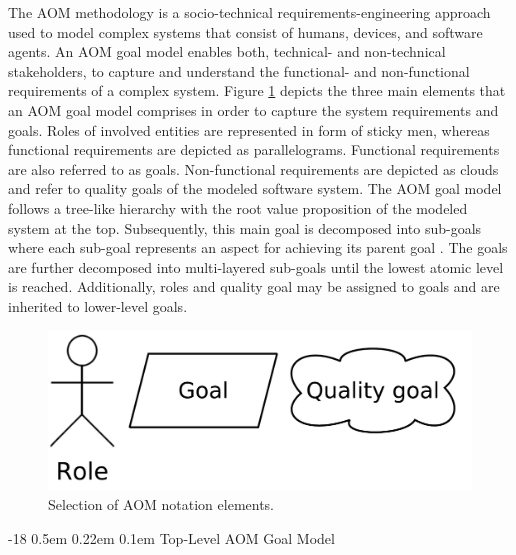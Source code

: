 \documentclass{llncs}
\makeatletter
\renewcommand\subsubsection{\@startsection{subsubsection}{3}{\z@}%
		{-18\p@ \@plus -4\p@ \@minus -4\p@}%
		{0.5em \@plus 0.22em \@minus 0.1em}%
		{\normalfont\normalsize\bfseries\boldmath}}
\makeatother
\begin{document}
{			The AOM methodology is a socio-technical requirements-engineering approach used to model complex systems that consist of humans, devices, and software agents. An AOM goal model enables both, technical- and non-technical stakeholders, to capture and understand the functional- and non-functional requirements of a complex system. Figure \ref{fig:aom-notaion-elements} depicts the three main elements that an AOM goal model comprises in order to capture the system requirements and goals. Roles of involved entities are represented in form of sticky men, whereas functional requirements are depicted as parallelograms. Functional requirements are also referred to as goals. Non-functional requirements are depicted as clouds and refer to quality goals of the modeled software system. The AOM goal model follows a tree-like hierarchy with the root value proposition of the modeled system at the top. Subsequently, this main goal is decomposed into sub-goals where each sub-goal represents an aspect for achieving its parent goal \cite{marshall2014agent}. The goals are further decomposed into multi-layered sub-goals until the lowest atomic level is reached. Additionally, roles and quality goal may be assigned to goals and are inherited to lower-level goals.

			\begin{figure}[H]
				\centering
				\includegraphics[scale=0.2]{Figures/20180426_AOM-notation.pdf}
				\caption{Selection of AOM notation elements.}	
				\label{fig:aom-notaion-elements}
			\end{figure}	
			
					
			\subsubsection{Top-Level AOM Goal Model}
				\label{sss:top-level-goal-model}

}
\end{document}
